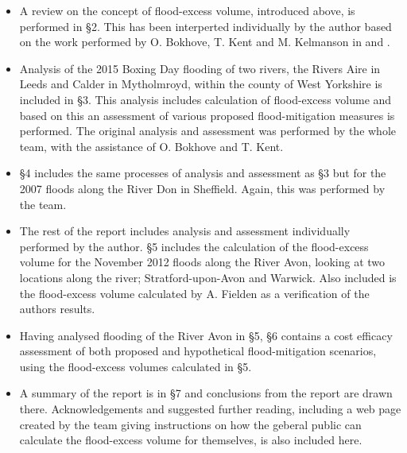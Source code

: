 \documentclass[11pt,a4paper]{article}
\begin{document}
\begin{framed}
\begin{itemize}
\item A review on the concept of flood-excess volume, introduced above, is performed in \S 2. This has been interperted individually by the author based on the work performed by O. Bokhove, T. Kent and M. Kelmanson in \cite{Aire} and \cite{Calder-Don}.
\item Analysis of the 2015 Boxing Day flooding of two rivers, the Rivers Aire in Leeds and Calder in Mytholmroyd, within the county of West Yorkshire is included in \S 3. This analysis includes calculation of flood-excess volume and based on this an assessment of various proposed flood-mitigation measures is performed. The original analysis and assessment was performed by the whole team, with the assistance of O. Bokhove and T. Kent.
\item \S 4 includes the same processes of analysis and assessment as \S 3 but for the 2007 floods along the River Don in Sheffield. Again, this was performed by the team.
\item The rest of the report includes analysis and assessment individually performed by the author. \S 5 includes the calculation of the flood-excess volume for the November 2012 floods along the River Avon, looking at two locations along the river{;} Stratford-upon-Avon and Warwick. Also included is the flood-excess volume calculated by A. Fielden as a verification of the authors results.
\item Having analysed flooding of the River Avon in \S 5, \S 6 contains a cost efficacy assessment of both proposed and hypothetical flood-mitigation scenarios, using the flood-excess volumes calculated in \S 5.
\item A summary of the report is in \S 7 and conclusions from the report are drawn there. Acknowledgements and suggested further reading, including a web page created by the team giving instructions on how the geberal public can calculate the flood-excess volume for themselves, is also included here.
\end{itemize}
\end{framed}
\end{document}
